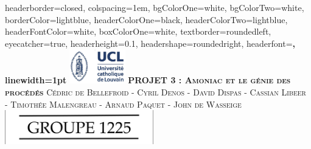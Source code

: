 \documentclass[landscape,a0paper,fontscale=0.285]{baposter} %
\begin{document}
\begin{poster}
{
headerborder=closed, %
colspacing=1em, %
bgColorOne=white, %
bgColorTwo=white, %
borderColor=lightblue, %
headerColorOne=black, %
headerColorTwo=lightblue, %
headerFontColor=white, %
boxColorOne=white, %
textborder=roundedleft, %
eyecatcher=true, %
headerheight=0.1\textheight, %
headershape=roundedright, %
headerfont=\Large\bf\textsc, %
linewidth=1pt %
}
%
{\includegraphics[height=4em]{UCL.jpg}} 
{\bf\textsc{PROJET 3 : Amoniac et le g\'enie des proc\'ed\'es}\vspace{0.5em}} 
{\textsc{\small Cédric de Bellefroid - Cyril Denos - David Dispas  - Cassian Libeer  - Timothée Malengreau - Arnaud Paquet - John de Wasseige}} 
{\includegraphics[height=4em]{groupe.png}} 




\end{poster}
\end{document}
